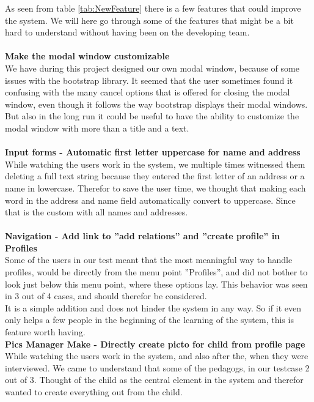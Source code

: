 As seen from table \ref{tab:NewFeature} there is a few features that could improve the system. We will here go through some of the features that might be a bit hard to understand without having been on the developing team.\\
\\
\textbf{Make the modal window customizable}\\
We have during this project designed our own modal window, because of some issues with the bootstrap library. It seemed that the user sometimes found it confusing with the many cancel options that is offered for closing the modal window, even though it follows the way bootstrap displays their modal windows.\\
But also in the long run it could be useful to have the ability to customize the modal window with more than a title and a text.\\
\\
\textbf{Input forms - Automatic first letter uppercase for name and address}\\
While watching the users work in the system, we multiple times witnessed them deleting a full text string because they entered the first letter of an address or a name in lowercase. Therefor to save the user time, we thought that making each word in the address and name field automatically convert to uppercase. Since that is the custom with all names and addresses.\\
\\
\textbf{Navigation - Add link to ''add relations'' and ''create profile'' in Profiles}\\
Some of the users in our test meant that the most meaningful way to handle profiles, would be directly from the menu point ''Profiles'', and did not bother to look just below this menu point, where these options lay. This behavior was seen in 3 out of 4 cases, and should therefor be considered.\\
It is a simple addition and does not hinder the system in any way. So if it even only helps a few people in the beginning of the learning of the system, this is feature worth having.
\\
\textbf{Pics Manager Make - Directly create picto for child from profile page}\\
While watching the users work in the system, and also after the, when they were interviewed. We came to understand that some of the pedagogs, in our testcase 2 out of 3. Thought of the child as the central element in the system and therefor wanted to create everything out from the child.\\
